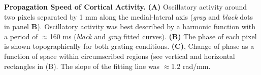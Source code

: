 \textbf{Propagation Speed of Cortical Activity.} \textbf{(A)} Oscillatory
activity around two pixels separated by 1 mm along the medial-lateral axis
(\textit{gray} and \textit{black} dots in panel \textbf{B}). Oscillatory
activity was best described by a harmonic function with a period of
$\approx$160 ms (\textit{black} and \textit{gray} fitted curves).
\textbf{(B)} The phase of each pixel is shown topographically for both
grating conditions. \textbf{(C)}, Change of phase as a function of space
within circumscribed regions (see vertical and horizontal rectangles in
(B). The slope of the fitting line was $\approx$1.2 rad/mm.
